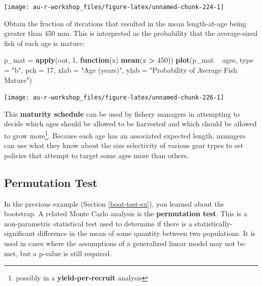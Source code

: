 \documentclass[]{book}
\newenvironment{Shaded}{\begin{snugshade}}{\end{snugshade}}
\newcommand{\ControlFlowTok}[1]{\textcolor[rgb]{0.13,0.29,0.53}{\textbf{#1}}}
\newcommand{\DataTypeTok}[1]{\textcolor[rgb]{0.13,0.29,0.53}{#1}}
\newcommand{\DecValTok}[1]{\textcolor[rgb]{0.00,0.00,0.81}{#1}}
\newcommand{\KeywordTok}[1]{\textcolor[rgb]{0.13,0.29,0.53}{\textbf{#1}}}
\newcommand{\NormalTok}[1]{#1}
\newcommand{\OperatorTok}[1]{\textcolor[rgb]{0.81,0.36,0.00}{\textbf{#1}}}
\newcommand{\StringTok}[1]{\textcolor[rgb]{0.31,0.60,0.02}{#1}}
\let\rmarkdownfootnote\footnote%
\def\footnote{\protect\rmarkdownfootnote}
\begin{document}
\begin{center}\texttt{[image: au-r-workshop\_files/figure-latex/unnamed-chunk-224-1]} \end{center}

Obtain the fraction of iterations that resulted in the mean length-at-age being greater than 450 mm. This is interpreted as the probability that the average-sized fish of each age is mature:

\begin{Shaded}
\begin{Highlighting}[]
\NormalTok{p_mat =}\StringTok{ }\KeywordTok{apply}\NormalTok{(out, }\DecValTok{1}\NormalTok{, }\ControlFlowTok{function}\NormalTok{(x) }\KeywordTok{mean}\NormalTok{(x }\OperatorTok{>}\StringTok{ }\DecValTok{450}\NormalTok{))}
\KeywordTok{plot}\NormalTok{(p_mat }\OperatorTok{~}\StringTok{ }\NormalTok{ages, }\DataTypeTok{type =} \StringTok{"b"}\NormalTok{, }\DataTypeTok{pch =} \DecValTok{17}\NormalTok{,}
     \DataTypeTok{xlab =} \StringTok{"Age (years)"}\NormalTok{, }\DataTypeTok{ylab =} \StringTok{"Probability of Average Fish Mature"}\NormalTok{)}
\end{Highlighting}
\end{Shaded}

\begin{center}\texttt{[image: au-r-workshop\_files/figure-latex/unnamed-chunk-226-1]} \end{center}

This \textbf{maturity schedule} can be used by fishery managers in attempting to decide which ages should be allowed to be harvested and which should be allowed to grow more\footnote{possibly in a \textbf{yield-per-recruit} analysis}. Because each age has an associated expected length, managers can use what they know about the size selectivity of various gear types to set policies that attempt to target some ages more than others.

\hypertarget{perm-test-ex}{%
\subsection{Permutation Test}\label{perm-test-ex}}

In the previous example (Section \ref{boot-test-ex}), you learned about the bootstrap. A related Monte Carlo analysis is the \textbf{permutation test}. This is a non-parametric statistical test used to determine if there is a statistically-significant difference in the mean of some quantity between two populations. It is used in cases where the assumptions of a generalized linear model may not be met, but a p-value is still required.
\end{document}
